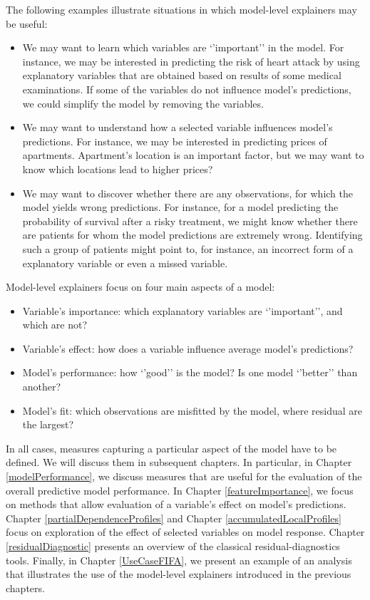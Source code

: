 \documentclass[]{krantz}
\providecommand{\tightlist}{%
  \setlength{\itemsep}{0pt}\setlength{\parskip}{0pt}}
\begin{document}
The following examples illustrate situations in which model-level explainers may be useful:

\begin{itemize}
\tightlist
\item
  We may want to learn which variables are `'important'' in the model. For instance, we may be interested in predicting the risk of heart attack by using explanatory variables that are obtained based on results of some medical examinations. If some of the variables do not influence model's predictions, we could simplify the model by removing the variables.
\item
  We may want to understand how a selected variable influences model's predictions. For instance, we may be interested in predicting prices of apartments. Apartment's location is an important factor, but we may want to know which locations lead to higher prices?
\item
  We may want to discover whether there are any observations, for which the model yields wrong predictions. For instance, for a model predicting the probability of survival after a risky treatment, we might know whether there are patients for whom the model predictions are extremely wrong. Identifying such a group of patients might point to, for instance, an incorrect form of a explanatory variable or even a missed variable.
\end{itemize}

Model-level explainers focus on four main aspects of a model:

\begin{itemize}
\tightlist
\item
  Variable's importance: which explanatory variables are `'important'', and which are not?
\item
  Variable's effect: how does a variable influence average model's predictions?
\item
  Model's performance: how `'good'' is the model? Is one model `'better'' than another?
\item
  Model's fit: which observations are misfitted by the model, where residual are the largest?
\end{itemize}

In all cases, measures capturing a particular aspect of the model have to be defined. We will discuss them in subsequent chapters. In particular, in Chapter \ref{modelPerformance}, we discuss measures that are useful for the evaluation of the overall predictive model performance. In Chapter \ref{featureImportance}, we focus on methods that allow evaluation of a variable's effect on model's predictions. Chapter \ref{partialDependenceProfiles} and Chapter \ref{accumulatedLocalProfiles} focus on exploration of the effect of selected variables on model response. Chapter \ref{residualDiagnostic} presents an overview of the classical residual-diagnostics tools. Finally, in Chapter \ref{UseCaseFIFA}, we present an example of an analysis that illustrates the use of the model-level explainers introduced in the previous chapters.
\end{document}
